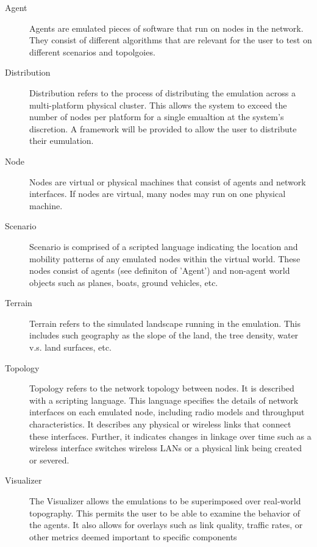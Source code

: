 \documentclass[titlepage]{article}
\begin{document}
\begin{description}
\item[Agent]
	Agents are emulated pieces of software that run on nodes in the network. They consist of different algorithms that are relevant for the user to test on different scenarios and topolgoies.   

\item[Distribution]
	Distribution refers to the process of distributing the emulation across a multi-platform physical cluster.  This allows the system to exceed the number of nodes per platform for a single emualtion at the system's discretion.  A framework will be provided to allow the user to distribute their eumulation. 	

\item[Node]
	Nodes are virtual or physical machines that consist of agents and network interfaces.  If nodes are virtual, many nodes may run on one physical machine.  

\item[Scenario]
	Scenario is comprised of a scripted language indicating the location and mobility patterns of any emulated nodes within the virtual world. These nodes consist of agents (see definiton of 'Agent') and non-agent world objects such as planes, boats, ground vehicles, etc. 

\item[Terrain]
	Terrain refers to the simulated landscape running in the emulation.  This includes such geography as the slope of the land, the tree density, water v.s. land surfaces, etc.

\item[Topology]
	Topology refers to the network topology between nodes. It is described with a scripting language.  This language specifies the details of network interfaces on each emulated node, including radio models and throughput characteristics.  It describes any physical or wireless links that connect these interfaces.  Further, it indicates changes in linkage over time such as a wireless interface switches wireless LANs or a physical link being created or severed. 

\item[Visualizer]
	The Visualizer allows the emulations to be superimposed over real-world topography.  This permits the user to be able to examine the behavior of the agents.  It also allows for overlays such as link quality, traffic rates, or other metrics deemed important to specific components

\end{description}
\end{document}

